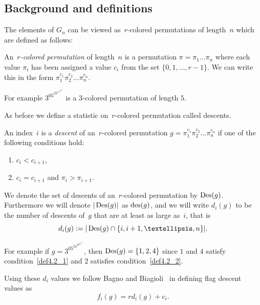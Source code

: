 \documentclass[10pt]{article}
\newcommand{\coloneqq}{:=}
\begin{document}
\subsection{Background and definitions}

The elements of $G_n$ can be viewed as~$r$-colored permutations of length~$n$ which are defined as follows:

	\begin{defi}

		An~\emph{$r$-colored permutation} of length~$n$ is a permutation $\pi=\pi_1\ldots \pi_n$ where each value $\pi_i$ has 
been assigned a value $c_i$ from the set $\{0,1,\ldots, r-1\}$. We can write this in the form 
$\pi_1^{c_1}\pi_2^{c_2}\ldots \pi_n^{c_n}$.
		
	\end{defi}

	For example $3^05^22^11^24^0$ is a $3$-colored permutation of length $5$.

	As before we define a statistic on~$r$-colored permutation called descents.

	\begin{defi}
	An index~$i$ is a \emph{descent} of an~$r$-colored permutation $g=\pi_1^{c_1}\pi_2^{c_2}\ldots \pi_n^{c_n}$ if one of the 
following conditions hold: 
\begin{enumerate}
\item\label{def4.2_1} $c_i<c_{i+1}$,
\item\label{def4.2_2} $c_i=c_{i+1}$ and $\pi_i>\pi_{i+1}$.
\end{enumerate}


 We denote the set of descents of an~$r$-colored permutation by $\operatorname{Des} (g)$. Furthermore we will denote $\vert \operatorname{Des} (g)\vert$ as 
$\operatorname{des} (g)$, and we will write $d_i(g)$ to be the number of descents of~$g$ that are at least as large as~$i$, that 
is
\begin{equation}
d_i(g)\coloneqq \vert \Des (g)\cap \{i,i+1,\ldots, n\}\vert.
\end{equation}
		

	\end{defi}

	For example if $g=3^05^24^26^01^12^1$, then $\operatorname{Des} (g)=\{1,2,4\}$ since $1$ and $4$ satisfy condition~\eqref{def4.2_1} and $2$ satisfies 
condition~\eqref{def4.2_2}.

	Using these $d_i$ values we follow Bagno and Biagioli~\cite{BB} in defining flag descent values 
as
\begin{equation}
f_i(g)=rd_i(g)+c_i.
\end{equation} 
\end{document}
